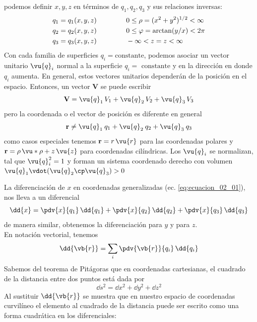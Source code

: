 podemos definir $x, y, z$ en términos de $q_{1}, q_{2}, q_{3}$ y sus relaciones inversas:
\begin{eqnarray}
\begin{aligned}
q_{1} = q_{1}(x,y,z) & \hspace{1.5cm} 0 \leq \rho = (x^{2} + y^{2})^{1/2} < \infty \\
q_{2} = q_{2}(x,y,z) & \hspace{1.5cm} 0 \leq \varphi = \arctan(y/x) < 2 \pi \\
q_{3} = q_{3}(x,y,z) & \hspace{1.5cm} - \infty < z = z < \infty
\end{aligned}
\label{eq:ecuacion_02_02}
\end{eqnarray}
Con cada familia de superficies $q_{i} = \mbox {constante}$, podemos asociar un vector unitario $\vu{q}_{i}$ normal a la superficie $q_{i} = \mbox{ constante}$ y en la dirección en donde $q_{i}$ aumenta. En general, estos vectores unitarios dependerán de la posición en el espacio. Entonces, un vector $\mathbf{V}$ se puede escribir
\begin{equation}
\mathbf{V} = \vu{q}_{1} \, V_{1} + \vu{q}_{2} \, V_{2} + \vu{q}_{3} \, V_{3}
\label{eq:ecuacion_02_03}
\end{equation}
pero la coordenada o el vector de posición es diferente en general
\[ \mathbf{r} \neq \vu{q}_{1} \: q_{1} + \vu{q}_{2} \: q_{2} + \vu{q}_{3} \: q_{3} \]
como casos especiales tenemos $\mathbf{r} = r \, \vu{r}$ para las coordenadas polares y $\mathbf{r} = \rho \, \vu*{\rho} + z \, \vu{z}$ para coordenadas cilíndricas. Los $\vu{q}_{i}$ se normalizan, tal que $\vu{q}_{i}^{2} = 1$ y forman un sistema coordenado derecho con volumen $\vu{q}_{1} \vdot (\vu{q}_{2} \cp \vu{q}_{3} ) > 0 $
\par
La diferenciación de $x$ en coordenadas generalizadas (ec. \ref{eq:ecuacion_02_01}), nos lleva a un diferencial
\begin{equation}
\dd{x}  = \pdv{x}{q_{1}} \, \dd{q_{1}} + \pdv{x}{q_{2}} \, \dd{q_{2}} + \pdv{x}{q_{3}} \, \dd{q_{3}}
\label{eq:ecuacion_02_04}
\end{equation}
de manera similar, obtenemos la diferenciación para $y$ y para $z$.
\\
En notación vectorial, tenemos
\[ \dd{\vb{r}} = \sum_{i} \pdv{\vb{r}}{q_{i}} \, \dd{q_{i}} \]
Sabemos del teorema de Pitágoras que en coordenadas cartesianas, el cuadrado de la distancia entre dos puntos está dada por
\[ \dd{s^{2}} = \dd{x^{2}} + \dd{y^{2}} + \dd{z^{2}} \]
Al sustituir $\dd{\vb{r}}$ se muestra que en nuestro espacio de coordenadas curvilíneo el elemento al cuadrado de la distancia puede ser escrito como una forma cuadrática en los diferenciales:
